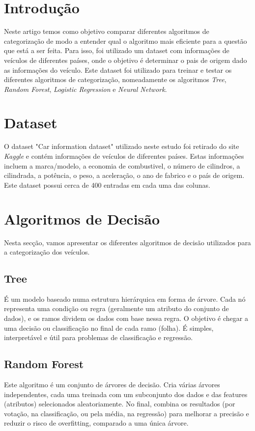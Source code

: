 \documentclass[conference]{IEEEtran}
\begin{document}
\section{Introdução}
Neste artigo temos como objetivo comparar diferentes algoritmos de categorização de modo a entender qual o algoritmo mais eficiente para
a questão que está a ser feita. Para isso, foi utilizado um dataset com informações de veículos de diferentes países, onde o objetivo é
determinar o pais de origem dado as informações do veículo. Este dataset foi utilizado para treinar e testar os diferentes algoritmos de
categorização, nomeadamente os algoritmos \textit{Tree}, \textit{Random Forest}, \textit{Logistic Regression} e \textit{Neural Network}.

\section{Dataset}
O dataset "Car information dataset" \cite{ref1} utilizado neste estudo foi retirado do site \textit{Kaggle} e contém informações de 
veículos de diferentes países. Estas informações incluem a marca/modelo, a economia de combustivel, o número de cilindros, a cilindrada, 
a potência, o peso, a aceleração, o ano de fabrico e o país de origem. Este dataset possui cerca de 400 entradas em cada uma das colunas.

\section{Algoritmos de Decisão}
Nesta secção, vamos apresentar os diferentes algoritmos de decisão utilizados para a categorização dos veículos.

\subsection{Tree}
É um modelo baseado numa estrutura hierárquica em forma de árvore. Cada nó representa uma condição ou regra 
(geralmente um atributo do conjunto de dados), e os ramos dividem os dados com base nessa regra. O objetivo 
é chegar a uma decisão ou classificação no final de cada ramo (folha). É simples, interpretável e útil para 
problemas de classificação e regressão.

\subsection{Random Forest}
Este algoritmo é um conjunto de árvores de decisão. Cria várias árvores independentes, cada uma treinada com 
um subconjunto dos dados e das features (atributos) selecionados aleatoriamente. No final, combina os resultados 
(por votação, na classificação, ou pela média, na regressão) para melhorar a precisão e reduzir o risco de overfitting, 
comparado a uma única árvore.
\end{document}
